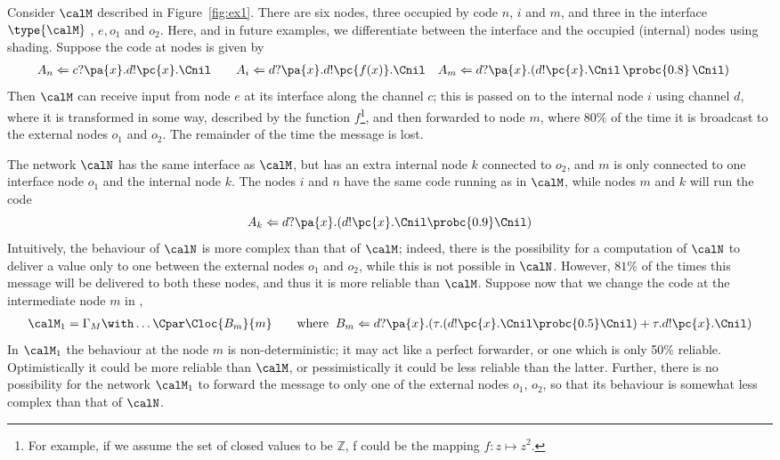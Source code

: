 \documentclass{LMCS}
\begin{document}
\begin{exa}\label{ex:ex1}
Consider $\calM$ described in Figure~\ref{fig:ex1}. 
There are six nodes, three occupied by code $n$, $i$ and $m$, and three in the interface
$\type{\calM}$ ,
$e, o_1$ and $o_2$. Here, and in future examples,  we  differentiate between the interface
and the occupied (internal) nodes using shading. Suppose the code at nodes is given by
\begin{align*}
  & A_n \Leftarrow c?\pa{x}.d!\pc{x}.\Cnil
  &&
  & A_i \Leftarrow d?\pa{x}.d!\pc{f(x)}.\Cnil
  &&
  &A_m \Leftarrow d?\pa{x}.(d!\pc{x}.\Cnil \,\probc{0.8}\, \Cnil)
\end{align*}
Then $\calM$ can receive input from node $e$ at its interface along the channel
$c$; this is passed on to the internal node $i$ using channel $d$, where it is transformed
in some way, described by the function $f$\footnote{For example, 
if we assume the set of closed values to be $\mathbb{Z}$, f could be the mapping 
$f: z \mapsto z^2$.}, and then forwarded to node $m$, where $80\%$ of the
time it is  broadcast to the external nodes $o_1$ and $o_2$. The remainder of the
time the message is lost. 

The network $\calN$ has the same interface as $\calM$, but has an extra internal node
$k$ connected to $o_2$,
and $m$ is only connected to one interface node $o_1$ and the internal node $k$. The nodes $i$ and $n$ 
have the same code running as in $\calM$, while nodes $m$ and $k$ will run the code
\[
A_k \Leftarrow d?\pa{x}.(d!\pc{x}.\Cnil \probc{0.9} \Cnil)
\]
Intuitively, the behaviour of $\calN$ is more complex than that of $\calM$; indeed, there is the 
possibility for a computation of $\calN$ to deliver a value only to one between the external nodes 
$o_1$ and $o_2$, while this is not possible in $\calN$. However, $81\%$ of the times this message 
will be delivered to both these nodes, and thus it is more reliable than $\calM$.
Suppose now that we change the code at the intermediate node $m$ in \calM, 
\begin{align*}
  &\calM_1 = \Gamma_M \with \ldots   \Cpar \Cloc{B_m}{m}
  &&
  &\text{where}\;\; B_m \Leftarrow d?\pa{x}.(\tau.(d!\pc{x}.\Cnil \probc{0.5} \Cnil ) + \tau.d!\pc{x}.\Cnil)
\end{align*}
In $\calM_1$ the behaviour at the node $m$ is non-deterministic; it may act like a perfect forwarder,
or one which is only 50\% reliable.  Optimistically it could be more reliable than $\calM$, or pessimistically it 
could be less reliable than the latter. Further, there is no possibility for the network $\calM_1$ to forward 
the message  to only one of the external nodes $o_1$, $o_2$, so that its behaviour is somewhat less complex than 
 that of $\calN$.


\end{exa}
\end{document}

